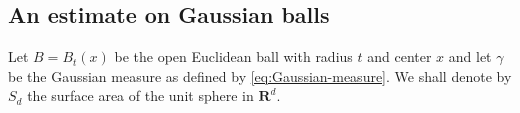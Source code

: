\documentclass{amsart}
\theoremstyle{remark}
\newcommand{\la}{\langle}
\newcommand{\ra}{\rangle}
\renewcommand{\leq}{\leqslant}
\renewcommand{\leq}{\leqslant}
\renewcommand{\geq}{\geqslant}
\newcommand{\R}{\mathbf R}
\newcommand{\e}{\mathrm{e}} %
\renewcommand{\leq}{\leqslant}%
\renewcommand{\geq}{\geqslant}%
\newcommand{\red}{\color{red}}
\begin{document}
\begin{comment}
    &\stackrel{\eqref{eq:Time-part-Mehler-time-transform-2}}{\leq}
    \exp\biggl (\frac{t}{\mu(\alpha)} |\la x, y \ra| \biggr).
  \end{align*}
  Hence, 
  \begin{align*}
    \frac{M_{\frac{t}{\alpha}}(x, y)}{M_{t}(x, y)} &\stackrel{\phantom{\eqref{eq:Exponential-estimates-1}}}{\leq}
    \alpha^{\frac{d}2} \exp\biggl (\frac{t}{\mu(\alpha)} |\la x, y \ra| \biggr)
    \exp\biggl(\e^{-2t} \frac{|x - y|^2}{1 - \e^{-2t}} \biggr)
    \exp\biggl(-\e^{-\frac{2t}{\alpha}} \frac{|x - y|^2}{1 -
      \e^{-\frac{2t}{\alpha}}}  \biggr)\\ 
  &\stackrel{\eqref{eq:Exponential-estimates-1}}{\leq}  {\red
 \alpha^{\frac{d}2} \exp\biggl (\frac{t}{\mu(\alpha)} |\la x, y \ra| \biggr)
    \exp\biggl(\frac{\e^{-2t}}{1 + \e^{-2t}} \frac{|x - y|^2}{1 - \e^{-t}} \biggr)
\exp \biggl(-\frac{\alpha}{2\e^{\frac{2t}\kappa(\alpha)}} \frac{|x -
      y|^2}{1 - \e^{-t}} \biggr)}
\\ 
  &\stackrel{\eqref{eq:extra1}}{\leq} \alpha^{\frac{d}2} \exp\biggl (\frac{t}{\mu(\alpha)} |\la x, y \ra|
    \biggr) \exp \biggl (\biggl[{\red{\frac12}}-\frac{\alpha}{4\e^{2
        \frac{t}{\kappa(\alpha)}}} \biggr]  \frac{|x - y|^2}{1 - \e^{-t}}
    \biggr ) \exp \biggl (-\frac{\alpha}{4\e^{\frac{2t}{\kappa(\alpha)}}} \frac{|x - y|^2}{1
      - \e^{-t}} \biggr). 
  \end{align*}
  Finally, we apply the assumption $\alpha \geq {\red 2} \e^{2
    \frac{t}{\kappa(\alpha)}}$ to obtain: 
  \begin{equation*}
    \frac{M_{\frac{t}{\alpha}}(x, y)}{M_t(x, y)} \leq \alpha^{\frac{d}2}
   \exp\biggl (\frac{t}{\mu(\alpha)} |\la x, y \ra| \biggr)
   \exp\biggl(-\frac{\alpha}{4\e^{\frac{2t}{\kappa(\alpha)}}} \frac{|x - y|^2}{1 - \e^{-t}}
   \biggr). 
 \end{equation*}
  Which is as asserted. 
\end{proof}
\end{comment}

\subsection{An estimate on Gaussian balls}
 Let $B = B_t(x)$ be the open Euclidean ball with radius $t$ and center $x$
  and let $\gamma$ be the Gaussian measure as defined by
  \eqref{eq:Gaussian-measure}. We shall denote by $S_d$ the surface area 
  of the unit sphere in $\R^d$.
\end{document}
